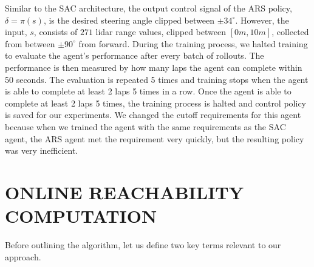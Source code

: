 \documentclass[manuscript,screen,review]{acmart}
\newcommand{\nate}[1]{\textcolor{magenta}{\textbf{\underline{Nate:}} #1}}
\begin{document}
Similar to the SAC architecture, the output control signal of the ARS policy, $\delta = \pi(s)$, is the desired steering angle clipped between $\pm34^{\circ}$. However, the input, $s$, consists of $271$ lidar range values, clipped between $[0m, 10m]$, collected from between $\pm90^{\circ}$ from forward. During the training process, we halted training to evaluate the agent's performance after every batch of rollouts. The performance is then measured by how many laps the agent can complete within 50 seconds. The evaluation is repeated 5 times and training stops when the agent is able to complete at least 2 laps 5 times in a row. Once the agent is able to complete at least 2 laps 5 times, the training process is halted and control policy is saved for our experiments. We changed the cutoff requirements for this agent because when we trained the agent with the same requirements as the SAC agent, the ARS agent met the requirement very quickly, but the resulting policy was very inefficient. %



\section{ONLINE REACHABILITY COMPUTATION}

Before outlining the algorithm, let us define two key terms relevant to our approach.\smallskip
\end{document}
